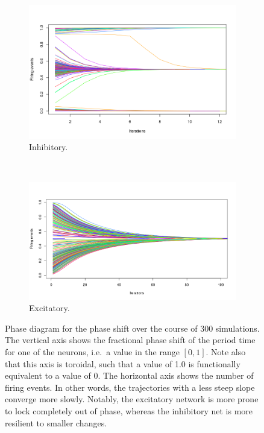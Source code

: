 \documentclass[10pt]{article}
\theoremstyle{plain}
\begin{document}
\begin{multicols*}{2}
\begin{figure}[H]
  \centering
  \begin{subfigure}[t]{.5\textwidth}
    \centering
    \includegraphics[trim={2.5cm 2.7cm 4cm 2.25cm}, clip,scale=.35]{phase_shift_inhib.png}
    \caption{Inhibitory.}
    \label{fig:inhib_all}
  \end{subfigure}\\
  \begin{subfigure}[t]{.5\textwidth}
    \centering
    \includegraphics[trim={2.5cm 2.7cm 4cm 2.25cm}, clip,scale=.3]{phase_shift_excit.png}
    \caption{Excitatory.}
    \label{fig:excit_all}
  \end{subfigure}%
  \caption{Phase diagram for the phase shift over the course of 300 simulations.
  The vertical axis shows the fractional phase shift of the period time for one of
the neurons, i.e.\ a value in the range $\left[ 0, 1 \right]$. Note also that
this axis is toroidal, such that a value of 1.0 is functionally equivalent to a
value of 0. The horizontal axis shows the number of firing events. In other words, the trajectories with a less
steep slope converge more slowly. Notably, the excitatory network is more prone
to lock completely out of phase, whereas the inhibitory net is more resilient to
smaller changes.}
\label{fig:comparison}
\end{figure}


\end{multicols*}
\end{document}
